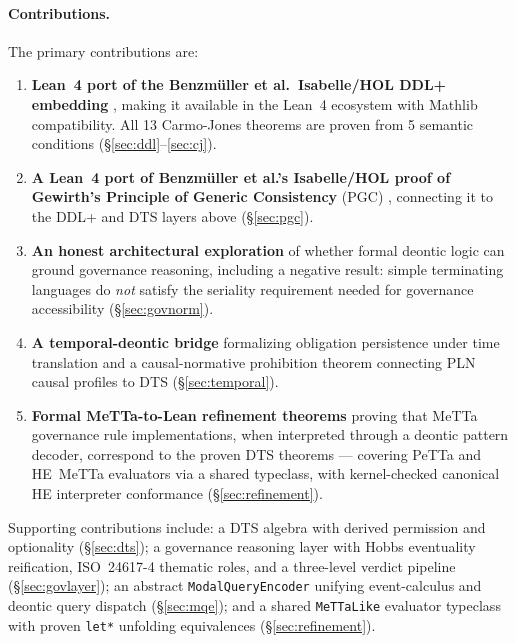 \documentclass[]{article}
\newcommand{\code}[1]{\texttt{#1}}
\newcommand{\DTS}{\textup{DTS}}
\newcommand{\PLN}{\textup{PLN}}
\newcommand{\PGC}{\textup{PGC}}
\begin{document}
\paragraph{Contributions.}
The primary contributions are:
\begin{enumerate}
\item \textbf{Lean~4 port of the Benzm{\"u}ller et al.\ Isabelle/HOL DDL+ embedding}
      \cite{Benzmuller2018}, making it available in the Lean~4 ecosystem with
      Mathlib compatibility.  All 13 Carmo-Jones theorems are proven from
      5 semantic conditions (§\ref{sec:ddl}--\ref{sec:cj}).
\item \textbf{A Lean~4 port of Benzm{\"u}ller et al.'s Isabelle/HOL proof of
      Gewirth's Principle of Generic Consistency} (\PGC{})
      \cite{Benzmuller2019PGC}, connecting it to the DDL+ and \DTS{} layers
      above (§\ref{sec:pgc}).
\item \textbf{An honest architectural exploration} of whether formal deontic logic
      can ground governance reasoning, including a negative result:
      simple terminating languages do \emph{not} satisfy the seriality
      requirement needed for governance accessibility (§\ref{sec:govnorm}).
\item \textbf{A temporal-deontic bridge} formalizing obligation persistence
      under time translation and a causal-normative prohibition theorem
      connecting \PLN{} causal profiles to \DTS{} (§\ref{sec:temporal}).
\item \textbf{Formal MeTTa-to-Lean refinement theorems} proving that MeTTa
      governance rule implementations, when interpreted through a deontic
      pattern decoder, correspond to the proven \DTS{} theorems ---
      covering PeTTa and HE~MeTTa evaluators via a shared typeclass,
      with kernel-checked canonical HE interpreter conformance
      (§\ref{sec:refinement}).
\end{enumerate}

\noindent
Supporting contributions include: a \DTS{} algebra with derived permission
and optionality (§\ref{sec:dts}); a governance reasoning layer with Hobbs
eventuality reification, ISO~24617-4 thematic roles, and a three-level
verdict pipeline (§\ref{sec:govlayer}); an abstract \code{ModalQueryEncoder}
unifying event-calculus and deontic query dispatch (§\ref{sec:mqe}); and
a shared \code{MeTTaLike} evaluator typeclass with proven \code{let*}
unfolding equivalences (§\ref{sec:refinement}).

\end{document}
